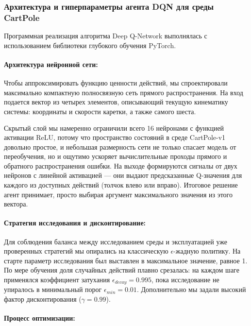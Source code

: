 \subsubsection{Архитектура и гиперпараметры агента DQN для среды CartPole}

Программная реализация алгоритма Deep Q-Network выполнялась с использованием библиотеки глубокого обучения PyTorch.

\paragraph{Архитектура нейронной сети:}

Чтобы аппроксимировать функцию ценности действий, мы спроектировали максимально компактную полносвязную сеть прямого распространения. На вход подается вектор из четырех элементов, описывающий текущую кинематику системы: координаты и скорости каретки, а также самого шеста. 

Скрытый слой мы намеренно ограничили всего 16 нейронами с функцией активации ReLU, потому что пространство состояний в среде CartPole-v1 довольно простое, и небольшая размерность сети не только спасает модель от переобучения, но и ощутимо ускоряет вычислительные проходы прямого и обратного распространения ошибки. На выходе формируются сигналы от двух нейронов с линейной активацией — они выдают предсказанные Q-значения для каждого из доступных действий (толчок влево или вправо). Итоговое решение агент принимает, просто выбирая аргумент максимального значения из этого вектора. 


\paragraph{Стратегия исследования и дисконтирование:}

Для соблюдения баланса между исследованием среды и эксплуатацией уже проверенных стратегий мы опирались на классическую $\epsilon$-жадную политику. На старте параметр исследования был выставлен в максимальное значение, равное 1. По мере обучения доля случайных действий плавно срезалась: на каждом шаге применялся коэффициент затухания $\epsilon_{decay} = 0.995$, пока исследование не упиралось в минимальный порог $\epsilon_{min} = 0.01$. Дополнительно мы задали высокий фактор дисконтирования ($\gamma = 0.99$).


\paragraph{Процесс оптимизации:}

